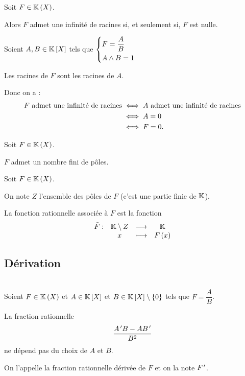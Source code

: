 \begin{prop}
Soit \(F\in\fracrat\).

Alors \(F\) admet une infinité de racines si, et seulement si, \(F\) est nulle.
\end{prop}

\begin{dem}
Soient \(A,B\in\poly\) tels que \(\begin{dcases}F=\dfrac{A}{B} \\ A\land B=1\end{dcases}\)

Les racines de \(F\) sont les racines de \(A\).

Donc on a : \[\begin{aligned}
F\text{ admet une infinité de racines}&\iff A\text{ admet une infinité de racines} \\
&\iff A=0 \\
&\iff F=0.
\end{aligned}\]
\end{dem}

\begin{rem}
Soit \(F\in\fracrat\).

\(F\) admet un nombre fini de pôles.
\end{rem}

\begin{defi}
Soit \(F\in\fracrat\).

On note \(Z\) l'ensemble des pôles de \(F\) (c'est une partie finie de \(\mathbb{K}\)).

La fonction rationnelle associée à \(F\) est la fonction \[\begin{array}[t]{cccc}\tilde{F} : & \mathbb{K}\setminus Z & \longrightarrow & \mathbb{K} \\ & x & \longmapsto & F\left(x\right)\end{array}\]
\end{defi}

\subsection{Dérivation}

\begin{defprop}~\\
Soient \(F\in\fracrat\) et \(A\in\poly\) et \(B\in\poly\excluant\accol{0}\) tels que \(F=\dfrac{A}{B}\).

La fraction rationnelle \[\dfrac{A^{\,\prime} B-AB^{\,\prime}}{B^2}\] ne dépend pas du choix de \(A\) et \(B\).

On l'appelle la fraction rationnelle dérivée de \(F\) et on la note \(F^{\,\prime}\).
\end{defprop}

